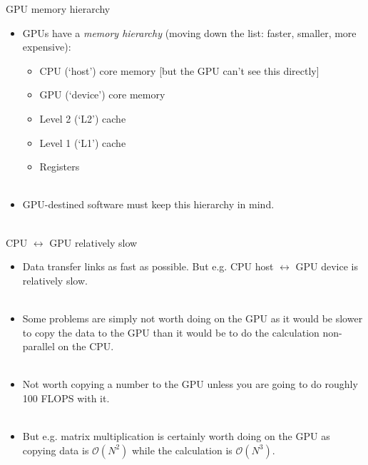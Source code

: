 \documentclass[usenames,dvipsnames]{beamer}
\begin{document}
\begin{frame}{GPU memory hierarchy}
  \begin{block}{}
    \begin{itemize}
      \item{GPUs have a \textit{memory hierarchy} (moving down the list: faster, smaller, more expensive):}
      \begin{itemize}
      \item{CPU (`host') core memory [but the GPU can't see this directly]}
      \item{GPU (`device') core memory}
      \item{Level 2 (`L2') cache}
      \item{Level 1 (`L1') cache}
      \item{Registers}\\~\
      \end{itemize}
      \item{GPU-destined software must keep this hierarchy in mind.}\\~\
    \end{itemize}
  \end{block}
\end{frame}

\begin{frame}{CPU $\leftrightarrow$ GPU relatively slow}
  \begin{block}{}
    \begin{itemize}
      \item{Data transfer links as fast as possible. But e.g. CPU host $\leftrightarrow$ GPU device is relatively slow.}\\~\
      \item{Some problems are simply not worth doing on the GPU as it would be slower to copy the data to the GPU than it would be to do the calculation non-parallel on the CPU.}\\~\
      \item{Not worth copying a number to the GPU unless you are going to do roughly 100 FLOPS with it.}\\~\
      \item{But e.g. matrix multiplication is certainly worth doing on the GPU as copying data is $\mathcal{O}(N^2)$ while the calculation is $\mathcal{O}(N^3)$.}\\~\
    \end{itemize}
  \end{block}
\end{frame}
\end{document}
